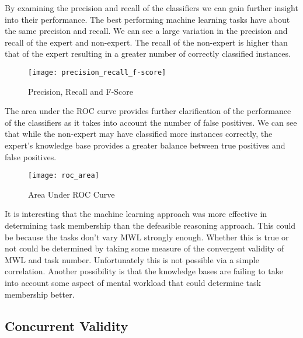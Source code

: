 By examining the precision and recall of the classifiers we can gain further insight into their performance. The best performing machine learning tasks have about the same precision and recall. We can see a large variation in the precision and recall of the expert and non-expert. The recall of the non-expert is higher than that of the expert resulting in a greater number of correctly classified instances.

\begin{figure}[!h]
\centering
\texttt{[image: precision\_recall\_f-score]}
\caption{Precision, Recall and F-Score}
\label{fig:precision_recall_f-score}
\end{figure}

The area under the ROC curve provides further clarification of the performance of the classifiers as it takes into account the number of false positives. We can see that while the non-expert may have classified more instances correctly, the expert's knowledge base provides a greater balance between true positives and false positives.  

\begin{figure}[!h]
\centering
\texttt{[image: roc\_area]}
\caption{Area Under ROC Curve}
\label{fig:precision_and_recall}
\end{figure}

It is interesting that the machine learning approach was more effective in determining task membership than the defeasible reasoning approach. This could be because the tasks don't vary MWL strongly enough. Whether this is true or not could be determined by taking some measure of the convergent validity of MWL and task number. Unfortunately this is not possible via a simple correlation. Another possibility is that the knowledge bases are failing to take into account some aspect of mental workload that could determine task membership better.

\subsection{Concurrent Validity}

